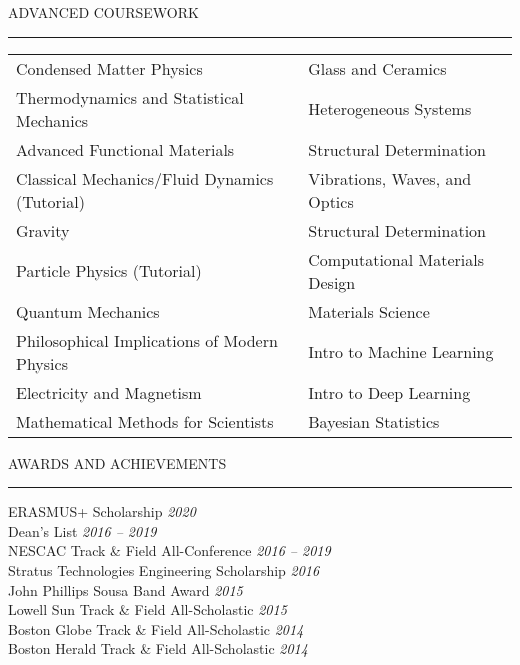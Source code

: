 \documentclass{resume} %
\renewenvironment{rSection}[1]{
	\sectionskip
	\textcolor{RoyalPurple}{\MakeUppercase{#1}}
	\sectionlineskip
	\hrule
	\begin{list}{}{
			\setlength{\leftmargin}{1.5em}
		}
		\item[]
	}{
	\end{list}
}
\begin{document}
	\begin{rSection}{Advanced Coursework} \itemsep -2pt
			\begin{tabular}{ @{} >{}l @{\hspace{6ex}} l }
				Condensed Matter Physics & Glass and Ceramics  \\
				Thermodynamics and Statistical Mechanics & Heterogeneous Systems \\
				Advanced Functional Materials & Structural Determination \\
				Classical Mechanics/Fluid Dynamics (Tutorial) & Vibrations, Waves, and Optics \\
				Gravity & Structural Determination\\
				Particle Physics (Tutorial) & Computational Materials Design\\
				Quantum Mechanics & Materials Science\\
				Philosophical Implications of Modern Physics & Intro to Machine Learning\\
				Electricity and Magnetism & Intro to Deep Learning \\
				Mathematical Methods for Scientists & Bayesian Statistics \\
			\end{tabular}
	\end{rSection}

	\begin{rSection}{Awards and Achievements} \itemsep -2pt
		ERASMUS+ Scholarship \hfill \textit{2020}\\
		Dean's List \hfill \textit{2016 -- 2019}\\
		NESCAC Track \& Field All-Conference \hfill \textit{2016 -- 2019}\\
		Stratus Technologies Engineering Scholarship \hfill \textit{2016} \\
		John Phillips Sousa Band Award \hfill \textit{2015}\\
		Lowell Sun Track \& Field All-Scholastic \hfill \textit{2015} \\
		Boston Globe Track \& Field All-Scholastic \hfill \textit{2014}\\
		Boston Herald Track \& Field All-Scholastic \hfill \textit{2014} \\
	\end{rSection}
\end{document}
